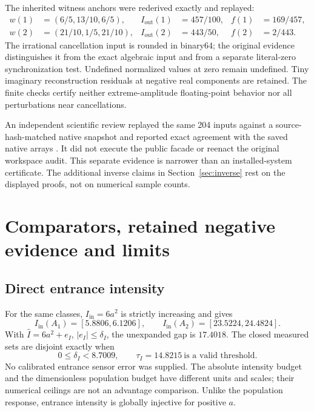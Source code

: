 \documentclass[11pt,a4paper]{article}
\newcommand{\Iout}{I_{\mathrm{out}}}
\newcommand{\Iin}{I_{\mathrm{in}}}
\begin{document}
The inherited witness anchors were rederived exactly and replayed:
\begin{align}
w(1)&=(6/5,13/10,6/5),& \Iout(1)&=457/100,& f(1)&=169/457,\\
w(2)&=(21/10,1/5,21/10),& \Iout(2)&=443/50,& f(2)&=2/443.
\end{align}
The irrational cancellation input is rounded in binary64; the original evidence distinguishes it from the exact algebraic input and from a separate literal-zero synchronization test. Undefined normalized values at zero remain undefined. Tiny imaginary reconstruction residuals at negative real components are retained. The finite checks certify neither extreme-amplitude floating-point behavior nor all perturbations near cancellations.

An independent scientific review replayed the same 204 inputs against a source-hash-matched native snapshot and reported exact agreement with the saved native arrays \cite{review}. It did not execute the public facade or reenact the original workspace audit. This separate evidence is narrower than an installed-system certificate. The additional inverse claims in Section~\ref{sec:inverse} rest on the displayed proofs, not on numerical sample counts.

\clearpage
\section{Comparators, retained negative evidence and limits}\label{sec:comparators}
\subsection{Direct entrance intensity}
For the same classes, $\Iin=6a^2$ is strictly increasing and gives
\begin{equation}
\Iin(A_1)=[5.8806,6.1206],\qquad
\Iin(A_2)=[23.5224,24.4824].
\end{equation}
With $\widehat I=6a^2+e_I$, $|e_I|\le\delta_I$, the unexpanded gap is $17.4018$. The closed measured sets are disjoint exactly when
\begin{equation}
0\le\delta_I<8.7009,\qquad \tau_I=14.8215\ \text{is a valid threshold}.\label{eq:entrance}
\end{equation}
No calibrated entrance sensor error was supplied. The absolute intensity budget and the dimensionless population budget have different units and scales; their numerical ceilings are not an advantage comparison. Unlike the population response, entrance intensity is globally injective for positive $a$.
\end{document}
